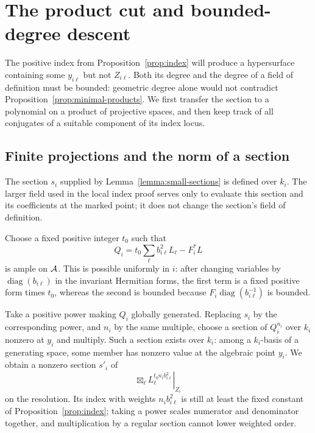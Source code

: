 \section{The product cut and bounded-degree descent}
\label{sec:product-cut}

The positive index from Proposition~\ref{prop:index} will produce a
hypersurface containing some $y_{i\ell}$ but not $Z_{i\ell}$.
Both its degree and
the degree of a field of definition must be bounded: geometric degree
alone would not contradict Proposition~\ref{prop:minimal-products}.
We first transfer the section to a polynomial on a product of
projective spaces, and then keep track of all conjugates of a suitable
component of its index locus.

\subsection{Finite projections and the norm of a section}

The section $s_i$ supplied by Lemma~\ref{lemma:small-sections} is
defined over $k_i$.  The larger field used in the local index proof
serves only to evaluate this section and its coefficients at the
marked point; it does not change the section's field of definition.

Choose a fixed positive integer $t_0$ such that
\begin{equation}\label{eq:cut-ample-difference}
 Q_i=t_0\sum_\ell b_{i\ell}^2L_\ell-F_i^*L
\end{equation}
is ample on $\mathcal A$.  This is possible uniformly in $i$: after changing
variables by $\operatorname{diag}(b_{i\ell})$ in the invariant
Hermitian forms, the first term is a fixed positive form times $t_0$,
whereas the second is bounded because
$F_i\operatorname{diag}(b_{i\ell}^{-1})$ is bounded.

Take a positive power making $Q_i$ globally generated.  Replacing
$s_i$ by the corresponding power, and $n_i$ by the same multiple,
choose a section of $Q_i^{n_i}$ over $k_i$ nonzero at $y_i$ and
multiply.  Such a section exists over $k_i$: among a $k_i$-basis of
a generating space, some member has nonzero value at the algebraic
point $y_i$.  We obtain a nonzero section $s'_i$ of
\[
 \left.\boxtimes_\ell L_\ell^{t_0n_ib_{i\ell}^2}\right|_{Z_i}
\]
on the resolution.  Its index with weights $n_ib_{i\ell}^2$ is still
at least the fixed constant of Proposition~\ref{prop:index}; taking
a power scales numerator and denominator together, and multiplication
by a regular section cannot lower weighted order.


